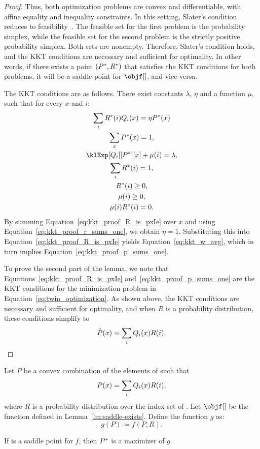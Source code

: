 \begin{proof}
    Thus, both optimization problems are convex and differentiable, with affine equality and inequality constraints.
    In this setting, Slater's condition reduces to feasibility~\cite{boyd2004convex}.
    The feasible set for the first problem is the probability simplex, while the feasible set for the second problem is
    the strictly positive probability simplex.
    Both sets are nonempty.
    Therefore, Slater's condition holds, and the KKT conditions are necessary and sufficient for optimality.
    In other words, if there exists a point $(P^{*}, R^{*})$ that satisfies the KKT conditions for both problems, it will be a
    saddle point for $\objf[]$, and vice versa.

    The KKT conditions are as follows.
    There exist constants $\lambda$, $\eta$ and a function $\mu$, such that for every $x$ and $i$:
    \begin{gather}
        \label{eq:kkt_proof_R_is_pxIe}
        \sum_i \saddR(i) Q_i(x) = \eta \saddP(x) \\
        \label{eq:kkt_proof_p_sums_one}
        \sum_{x} \saddP(x) = 1, \\
        \nonumber
        \klExp[Q_i][\saddP][x] + \mu(i) = \lambda, \\
        \label{eq:kkt_proof_r_sums_one}
        \sum_i \saddR(i) = 1, \\
        \nonumber
        \saddR(i) \geq 0, \\
        \nonumber
        \mu(i) \geq 0, \\
        \nonumber
        \mu(i) \saddR(i) = 0.
    \end{gather}
    By summing Equation~\ref{eq:kkt_proof_R_is_pxIe} over $x$ and using Equation~\ref{eq:kkt_proof_r_sums_one},
    we obtain $\eta = 1$.
    Substituting this into Equation~\ref{eq:kkt_proof_R_is_pxIe} yields Equation~\ref{eq:kkt_w_avg},
    which in turn implies Equation~\ref{eq:kkt_proof_p_sums_one}.

    To prove the second part of the lemma, we note that Equations~\ref{eq:kkt_proof_R_is_pxIe}
    and~\ref{eq:kkt_proof_p_sums_one} are the KKT conditions for the minimization problem
    in Equation~\ref{eq:twin_optimization}.
    As shown above, the KKT conditions are necessary and sufficient for optimality,
    and when $R$ is a probability distribution, these conditions simplify to
    \[
        \hat P(x) = \sum_i Q_i(x) R(i). \qedhere
    \]
\end{proof}

\begin{lemma}
    \label{lm:saddle-maximizes-g}
    Let $P$ be a convex combination of the elements of \setQ such that
    \[
        P(x) = \sum_i Q_i(x) R(i),
    \]
    where $R$ is a probability distribution over the index set of \setQ.
    Let $\objf[]$ be the function defined in Lemma~\ref{lm:saddle-exists}.
    Define the function $g$ as:
    \[
        g(P) \coloneqq f(P, R).
    \]

    If \saddle is a saddle point for $f$, then $P^{*}$ is a maximizer of $g$.
\end{lemma}


